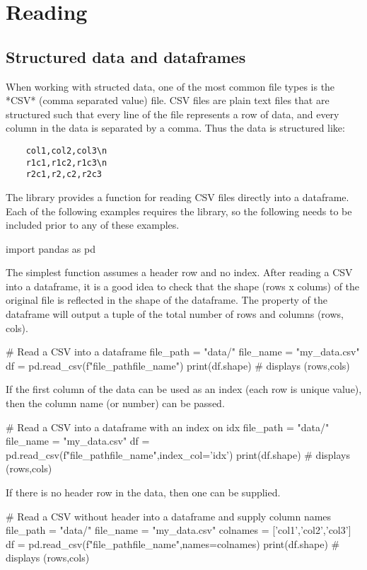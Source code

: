 \chapter{Reading}
\label{chapter:reading}

\section{Structured data and dataframes}

When working with structed data, one of the most common file types is the *CSV* (comma separated value) file. CSV files are plain text files that are structured such that every line of the file represents a row of data, and every column in the data is separated by a comma. Thus the data is structured like:

\begin{verbatim}
    col1,col2,col3\n
    r1c1,r1c2,r1c3\n
    r2c1,r2,c2,r2c3
\end{verbatim}

The  library provides a function for reading CSV files directly into a dataframe.
Each of the following examples requires the library, so the following  needs to be included prior to any of these examples.

\begin{pycode}
    import pandas as pd
\end{pycode}

The simplest  function assumes a header row and no index. After reading a CSV into a dataframe, it is a good idea to check that the shape (rows x colums) of the original  file is reflected in the shape of the dataframe. The  property of the dataframe will output a tuple of the total number of rows and columns (rows, cols).

\begin{pycode}
    # Read a CSV into a dataframe
    file_path = "data/"
    file_name = "my_data.csv"
    df = pd.read_csv(f"{file_path}{file_name}")
    print(df.shape) # displays (rows,cols)
\end{pycode}

If the first column of the data can be used as an index (each row is unique value), then the column name (or number) can be passed.

\begin{pycode}
    # Read a CSV into a dataframe with an index on idx
    file_path = "data/"
    file_name = "my_data.csv"
    df = pd.read_csv(f"{file_path}{file_name}",index_col='idx')
    print(df.shape) # displays (rows,cols)
\end{pycode}

\newpage
If there is no header row in the data, then one can be supplied.

\begin{pycode}
    # Read a CSV without header into a dataframe and supply column names
    file_path = "data/"
    file_name = "my_data.csv"
    colnames = ['col1','col2','col3']
    df = pd.read_csv(f"{file_path}{file_name}",names=colnames)
    print(df.shape) # displays (rows,cols)
\end{pycode}

